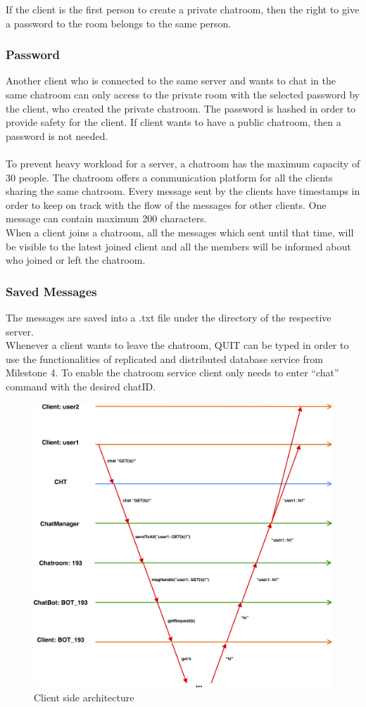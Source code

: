 If the client is the first person to create a private chatroom, then the right to give a password to the room belongs to the same person.
\subsubsection{Password}
\label{sec:groupchat_executionoftheworkflow_chatrooms_password}

Another client who is connected to the same server and wants to chat in the same chatroom can only access to the private room with the selected password by the client, who created the private chatroom. The password is hashed in order to provide safety for the client. If client wants to have a public chatroom, then a password is not needed.\\
\\
To prevent heavy workload for a server, a chatroom has the maximum capacity of 30 people. The chatroom offers a communication platform for all the clients sharing the same chatroom. Every message sent by the clients have timestamps in order to keep on track with the flow of the messages for other clients. One message can contain maximum 200 characters.\\
When a client joins a chatroom, all the messages which sent until that time, will be visible to the latest joined client and all the members will be informed about who joined or left the chatroom. 
\subsubsection{Saved Messages}
\label{sec:groupchat_executionoftheworkflow_savedmessages}

The messages are saved into a .txt file under the directory of the respective server.\\

Whenever a client wants to leave the chatroom, QUIT can be typed in order to use the functionalities of replicated and distributed database service from Milestone 4. To enable the chatroom service client only needs to enter “chat” command with the desired chatID. 

\begin{figure}[h]
	\centering
	\includegraphics[width=\linewidth]{figures/chat_graph.png}
	\caption{Client side architecture}
\end{figure}



